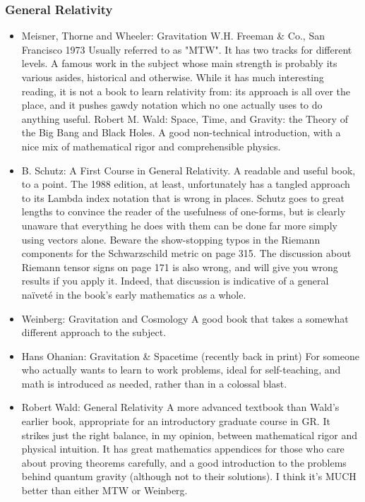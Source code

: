 \documentclass[10pt,a4paper]{book}
\theoremstyle{definition}
\begin{document}
\subsubsection{General Relativity}
\begin{itemize}
\item 
Meisner, Thorne and Wheeler: Gravitation W.H. Freeman \& Co., San Francisco 1973
Usually referred to as "MTW".  It has two tracks for different levels.  A famous work in the subject whose main strength is probably its various asides, historical and otherwise.  While it has much interesting reading, it is not a book to learn relativity from: its approach is all over the place, and it pushes gawdy notation which no one actually uses to do anything useful.
Robert M. Wald: Space, Time, and Gravity: the Theory of the Big Bang and Black Holes.
A good non-technical introduction, with a nice mix of mathematical rigor and comprehensible physics.
\item B. Schutz: A First Course in General Relativity.
A readable and useful book, to a point.  The 1988 edition, at least, unfortunately has a tangled approach to its Lambda index notation that is wrong in places.  Schutz goes to great lengths to convince the reader of the usefulness of one-forms, but is clearly unaware that everything he does with them can be done far more simply using vectors alone.  Beware the show-stopping typos in the Riemann components for the Schwarzschild metric on page 315.  The discussion about Riemann tensor signs on page 171 is also wrong, and will give you wrong results if you apply it.  Indeed, that discussion is indicative of a general naïveté in the book's early mathematics as a whole.
\item Weinberg: Gravitation and Cosmology
A good book that takes a somewhat different approach to the subject.
\item Hans Ohanian: Gravitation \& Spacetime (recently back in print)
For someone who actually wants to learn to work problems, ideal for self-teaching, and math is introduced as needed, rather than in a colossal blast.
\item Robert Wald: General Relativity
A more advanced textbook than Wald's earlier book, appropriate for an introductory graduate course in GR.  It strikes just the right balance, in my opinion, between mathematical rigor and physical intuition.  It has great mathematics appendices for those who care about proving theorems carefully, and a good introduction to the problems behind quantum gravity (although not to their solutions).  I think it's MUCH better than either MTW or Weinberg.

\end{itemize}
\end{document}

